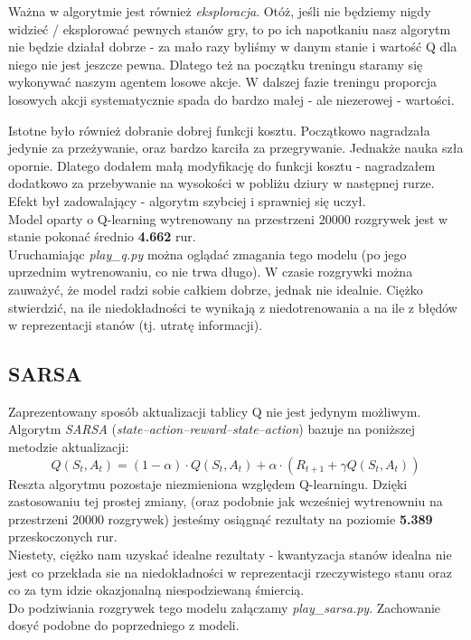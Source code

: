 \documentclass[12pt, A4]{article}
\begin{document}
	Ważna w algorytmie jest również \textit{eksploracja}. Otóż, jeśli nie będziemy nigdy widzieć / eksplorować pewnych stanów gry, to po ich napotkaniu nasz algorytm nie będzie działał dobrze - za mało razy byliśmy w danym stanie i wartość Q dla niego nie jest jeszcze pewna. Dlatego też na początku treningu staramy się wykonywać naszym agentem losowe akcje. W dalszej fazie treningu proporcja losowych akcji systematycznie spada do bardzo małej - ale niezerowej - wartości.    

	Istotne było również dobranie dobrej funkcji kosztu. Początkowo nagradzała jedynie za przeżywanie, oraz bardzo karciła za przegrywanie. Jednakże nauka szła opornie. Dlatego dodałem małą modyfikację do funkcji kosztu - nagradzałem dodatkowo za przebywanie na wysokości w pobliżu dziury w następnej rurze. Efekt był zadowalający - algorytm szybciej i sprawniej się uczył. \\
	Model oparty o Q-learning wytrenowany na przestrzeni 20000 rozgrywek jest w stanie pokonać średnio \textbf{4.662} rur.	\\
	Uruchamiając \textit{play\_q.py} można oglądać zmagania tego modelu (po jego uprzednim wytrenowaniu, co nie trwa długo). W czasie rozgrywki można zauważyć, że model radzi sobie całkiem dobrze, jednak nie idealnie. Ciężko stwierdzić, na ile niedokładności te wynikają z niedotrenowania a na ile z błędów w reprezentacji stanów (tj. utratę informacji). 

	\subsection{SARSA}
	Zaprezentowany sposób aktualizacji tablicy Q nie jest jedynym możliwym. Algorytm \textit{SARSA} (\textit{state–action–reward–state–action}) bazuje na poniższej metodzie aktualizacji:
	\[	Q(S_t, A_t) = (1-\alpha)\cdot Q(S_t, A_t) + \alpha \cdot \left( R_{t+1} + \gamma Q(S_t, A_t) \right)	\]
	Reszta algorytmu pozostaje niezmieniona względem Q-learningu. Dzięki zastosowaniu tej prostej zmiany, (oraz podobnie jak wcześniej wytrenowniu na przestrzeni 20000 rozgrywek) jesteśmy osiągnąć rezultaty na poziomie \textbf{5.389} przeskoczonych rur.\\

	Niestety, ciężko nam uzyskać idealne rezultaty - kwantyzacja stanów idealna nie jest co przekłada sie na niedokładności w reprezentacji rzeczywistego stanu oraz co za tym idzie okazjonalną niespodziewaną śmiercią.\\
	Do podziwiania rozgrywek tego modelu załączamy \textit{play\_sarsa.py}. Zachowanie dosyć podobne do poprzedniego z modeli.
\end{document}
